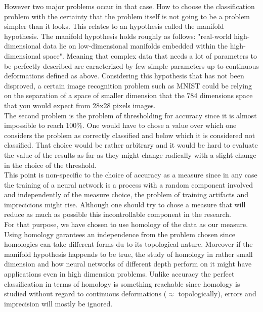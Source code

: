 \documentclass[12pt, a4paper]{article}
\begin{document}
However two major problems occur in that case. How to choose the classification problem with the certainty that the problem itself is not going to be a problem simpler than it looks. This relates to an hypothesis called the manifold hypothesis. The manifold hypothesis holds roughly as follows: "real-world high-dimensional data lie on low-dimensional manifolds embedded within the high-dimensional space". Meaning that complex data that needs a lot of parameters to be perfectly described are caracterized by few simple parameters up to continuous deformations defined as above. Considering this hypothesis that has not been disproved, a certain image recognition problem such as MNIST could be relying on the separation of a space of smaller dimension that the 784 dimensions space that you would expect from 28x28 pixels images.\\

The second problem is the problem of thresholding for accuracy since it is almost impossible to reach 100\%. One would have to chose a value over which one considers the problem as correctly classified and below which it is considered not classified. That choice would be rather arbitrary and it would be hard to evaluate the value of the results as far as they might change radically with a slight change in the choice of the threshold.\\

This point is non-specific to the choice of accuracy as a measure since in any case the training of a neural network is a process with a random component involved and independently of the measure choice, the problem of training artifacts and imprecicions might rise. Although one should try to chose a measure that will reduce as much as possible this incontrollable component in the research.\\

For that purpose, we have chosen to use homology of the data as our measure. Using homology garantees an independence from the problem chosen since homologies can take different forms du to its topological nature. Moreover if the manifold hypothesis happends to be true, the study of homology in rather small dimension and how neural networks of different depth perform on it might have applications even in high dimension problems. Unlike accuracy the perfect classification in terms of homology is something reachable since homology is studied without regard to continuous deformations ($\approx$ topologically), errors and imprecision will mostly be ignored.\\
\end{document}
